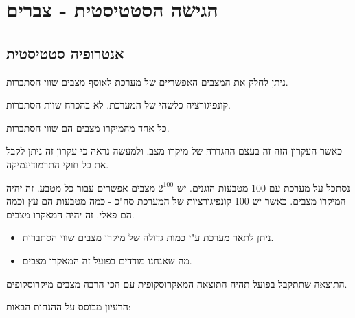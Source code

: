 \documentclass{tstextbook}
\begin{document}
\section{הגישה הסטטיסטית - צברים}

\subsection{אנטרופיה סטטיסטית}

\begin{definition}
ניתן לחלק את המצבים האפשריים של מערכת לאוסף מצבים שווי הסתברות.

\end{definition}
\begin{definition}
קונפיגורציה כלשהי של המערכת. לא בהכרח שוות הסתברות.

\end{definition}
\begin{theorem}
כל אחד מהמיקרו מצבים הם שווי הסתברות.

\end{theorem}
כאשר העקרון הזה זה בעצם ההגדרה של מיקרו מצב. ולמעשה נראה כי עקרון זה ניתן לקבל את כל חוקי התרמודינמיקה.

\begin{example}
נסתכל על מערכת עם 100 מטבעות הוגנים. יש \(2^{100}\) מצבים אפשרים עבור כל מטבע. זה יהיה המיקרו מצבים.
כאשר יש 100 קונפיגורציות של המערכת סה"כ - כמה מטבעות הם עץ וכמה הם פאלי. זה יהיה המאקרו מצבים.

\end{example}
\begin{corollary}
  \begin{itemize}
    \item ניתן לתאר מערכת ע"י כמות גדולה של מיקרו מצבים שווי הסתברות.
    \item מה שאנחנו מודדים בפועל זה המאקרו מצבים.
  \end{itemize}
\end{corollary}
\begin{proposition}
התוצאה שתתקבל בפועל תהיה התוצאה המאקרוסקופית עם הכי הרבה מצבים מיקרוסקופים.

\end{proposition}
הרעיון מבוסס על ההנחות הבאות:
\end{document}
